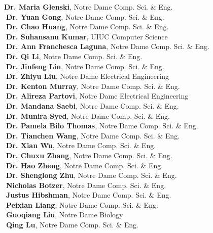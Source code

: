 \documentclass[10pt]{article}
\newenvironment{myindentpar}[1]%
{\begin{list}{}%
         {\setlength{\leftmargin}{#1}}%
         \item[]%
}
{\end{list}}
\newcounter{list}
\begin{document}
\begin{myindentpar}{0.75cm}
{\textcolor{white}{} {\bf Dr. Maria Glenski}, Notre Dame Comp. Sci. \& Eng. \\
\textcolor{white}{.}{\bf Dr. Yuan Gong}, Notre Dame Comp. Sci. \& Eng. \\
\textcolor{white}{.}{\bf Dr. Chao Huang}, Notre Dame Comp. Sci. \& Eng. \\
\textcolor{white}{.}{\bf Dr. Suhansanu Kumar}, UIUC Computer Science \\
\textcolor{white}{.}{\bf Dr. Ann Franchesca Laguna}, Notre Dame Comp. Sci. \& Eng. \\
\textcolor{white}{.}{\bf Dr. Qi Li}, Notre Dame Comp. Sci. \& Eng. \\
\textcolor{white}{.}{\bf Dr. Jinfeng Lin}, Notre Dame Comp. Sci. \& Eng. \\
\textcolor{white}{.}{\bf Dr. Zhiyu Liu}, Notre Dame Electrical Engineering \\
\textcolor{white}{.}{\bf Dr. Kenton Murray}, Notre Dame Comp. Sci. \& Eng. \\
\textcolor{white}{.}{\bf Dr. Alireza Partovi}, Notre Dame Electrical Engineering \\
\textcolor{white}{.}{\bf Dr. Mandana Saebi}, Notre Dame Comp. Sci. \& Eng. \\
\textcolor{white}{.}{\bf Dr. Munira Syed}, Notre Dame Comp. Sci. \& Eng. \\
\textcolor{white}{.}{\bf Dr. Pamela Bilo Thomas}, Notre Dame Comp. Sci. \& Eng. \\
\textcolor{white}{.}{\bf Dr. Tianchen Wang}, Notre Dame Comp. Sci. \& Eng. \\
\textcolor{white}{.}{\bf Dr. Xian Wu}, Notre Dame Comp. Sci. \& Eng. \\
\textcolor{white}{.}{\bf Dr. Chuxu Zhang}, Notre Dame Comp. Sci. \& Eng. \\
\textcolor{white}{.}{\bf Dr. Hao Zheng}, Notre Dame Comp. Sci. \& Eng. \\
\textcolor{white}{.}{\bf Dr. Shenglong Zhu}, Notre Dame Comp. Sci. \& Eng. \\
\textcolor{white}{.}{\bf Nicholas Botzer}, Notre Dame Comp. Sci. \& Eng. \\
\textcolor{white}{.}{\bf Justus Hibshman}, Notre Dame Comp. Sci. \& Eng. \\
\textcolor{white}{.}{\bf Peixian Liang}, Notre Dame Comp. Sci. \& Eng. \\
\textcolor{white}{.}{\bf Guoqiang Liu}, Notre Dame Biology \\
\textcolor{white}{.}{\bf Qing Lu}, Notre Dame Comp. Sci. \& Eng.
}


\end{myindentpar}
\end{document}
